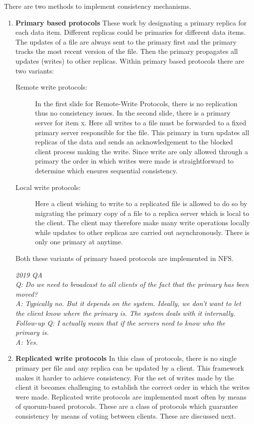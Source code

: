 \documentclass[twoside]{article}
\begin{document}
There are two methods to implement consistency mechanisms.

\begin{enumerate}
\item \textbf{Primary based protocols}  
  These work by designating a primary replica for each data item. Different replicas could be primaries for different data items. The updates of a file are always sent to the primary first and the primary tracks the most recent version of the file. Then the primary propagates all updates (writes) to other replicas.  Within primary based protocols there are two variants:
  \begin{description}
   \item [Remote write protocols:] In the first slide for Remote-Write Protocols, there is no replication thus no consistency issues. In the second slide, there is a primary server for item x. Here all writes to a file must be forwarded to a fixed primary server responsible for the file. This primary in turn updates all replicas of the data and sends an acknowledgement to the blocked client process making the write. Since write are only allowed through a primary the order in which writes were made is straightforward to determine which ensures sequential consistency.
   \item [Local write protocols:] Here a client wishing to write to a replicated file is allowed to do so by migrating the primary copy of a file to a replica server which is local to the client. The client may therefore make many write operations locally while updates to other replicas are carried out asynchronously. There is only one primary at anytime.
  \end{description}
  Both these variants of primary based protocols are implemented in NFS.
  
  \textit{2019 QA\\
  Q: Do we need to broadcast to all clients of the fact that the primary has been moved?\\
  A: Typically no. But it depends on the system. Ideally, we don't want to let the client know where the primary is. The system deals with it internally.\\
  Follow-up Q: I actually mean that if the servers need to know who the primary is.\\
  A: Yes.\\
}

\item \textbf{Replicated write protocols}
  In this class of protocols, there is no single primary per file and any replica can be updated by a client. This framework makes it harder to achieve consistency. For the set of writes made by the client it becomes challenging to establish the correct order in which the writes were made. Replicated write protocols are implemented most often by means of quorum-based protocols. These are a class of protocols which guarantee consistency by means of voting between clients. These are discussed next.
\end{enumerate}
\end{document}
